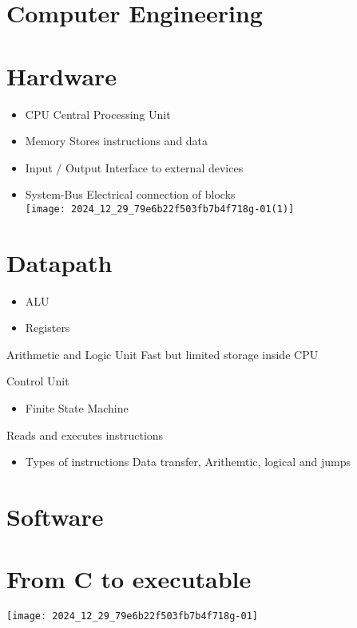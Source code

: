\section{Computer Engineering}

\section*{Hardware}
\begin{itemize}
  \item CPU Central Processing Unit
  \item Memory Stores instructions and data
  \item Input / Output Interface to external devices
  \item System-Bus Electrical connection of blocks\\
\texttt{[image: 2024\_12\_29\_79e6b22f503fb7b4f718g-01(1)]}
\end{itemize}

\section*{Datapath}
\begin{itemize}
  \item ALU
  \item Registers
\end{itemize}

Arithmetic and Logic Unit Fast but limited storage inside CPU

Control Unit

\begin{itemize}
  \item Finite State Machine
\end{itemize}

Reads and executes instructions

\begin{itemize}
  \item Types of instructions Data transfer, Arithemtic, logical and jumps
\end{itemize}

\section*{Software}
\section*{From C to executable}
\begin{center}
\texttt{[image: 2024\_12\_29\_79e6b22f503fb7b4f718g-01]}
\end{center}


